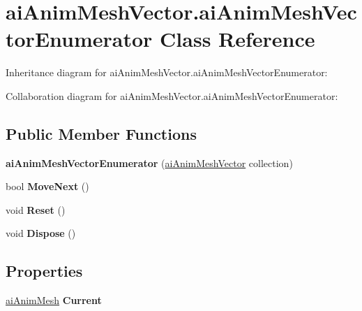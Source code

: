 \hypertarget{classai_anim_mesh_vector_1_1ai_anim_mesh_vector_enumerator}{\section{ai\+Anim\+Mesh\+Vector.\+ai\+Anim\+Mesh\+Vector\+Enumerator Class Reference}
\label{classai_anim_mesh_vector_1_1ai_anim_mesh_vector_enumerator}
}


Inheritance diagram for ai\+Anim\+Mesh\+Vector.\+ai\+Anim\+Mesh\+Vector\+Enumerator\+:


Collaboration diagram for ai\+Anim\+Mesh\+Vector.\+ai\+Anim\+Mesh\+Vector\+Enumerator\+:
\subsection*{Public Member Functions}
\begin{DoxyCompactItemize}
\item 
\hypertarget{classai_anim_mesh_vector_1_1ai_anim_mesh_vector_enumerator_ae1c4e3d08d52f319a46cd5352e9ebf11}{{\bfseries ai\+Anim\+Mesh\+Vector\+Enumerator} (\hyperlink{classai_anim_mesh_vector}{ai\+Anim\+Mesh\+Vector} collection)}\label{classai_anim_mesh_vector_1_1ai_anim_mesh_vector_enumerator_ae1c4e3d08d52f319a46cd5352e9ebf11}

\item 
\hypertarget{classai_anim_mesh_vector_1_1ai_anim_mesh_vector_enumerator_ad7da50d27ab5a34e0ce96948375d82e6}{bool {\bfseries Move\+Next} ()}\label{classai_anim_mesh_vector_1_1ai_anim_mesh_vector_enumerator_ad7da50d27ab5a34e0ce96948375d82e6}

\item 
\hypertarget{classai_anim_mesh_vector_1_1ai_anim_mesh_vector_enumerator_a2f251c6645cf38a43e02b01a0f7b80c6}{void {\bfseries Reset} ()}\label{classai_anim_mesh_vector_1_1ai_anim_mesh_vector_enumerator_a2f251c6645cf38a43e02b01a0f7b80c6}

\item 
\hypertarget{classai_anim_mesh_vector_1_1ai_anim_mesh_vector_enumerator_adb00c529fdb953fa1bc55c708b1b09c8}{void {\bfseries Dispose} ()}\label{classai_anim_mesh_vector_1_1ai_anim_mesh_vector_enumerator_adb00c529fdb953fa1bc55c708b1b09c8}

\end{DoxyCompactItemize}
\subsection*{Properties}
\begin{DoxyCompactItemize}
\item 
\hypertarget{classai_anim_mesh_vector_1_1ai_anim_mesh_vector_enumerator_a415508abfa1cd9a7034592139097f16d}{\hyperlink{structai_anim_mesh}{ai\+Anim\+Mesh} {\bfseries Current}}\label{classai_anim_mesh_vector_1_1ai_anim_mesh_vector_enumerator_a415508abfa1cd9a7034592139097f16d}

\end{DoxyCompactItemize}


